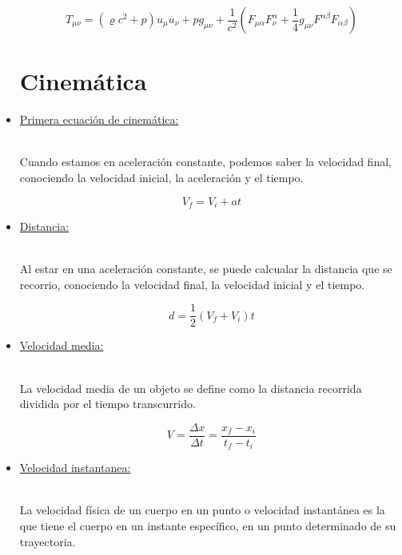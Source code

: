 \documentclass[letterpaper,12pt]{article}
\begin{document}
\begin{itemize}
{    $$T_{\mu\nu}=(\varrho c^2+p)u_\mu u_\nu + pg_{\mu\nu}+\frac{1}{c^2}(F_{\mu\alpha}F_\nu^\alpha+\frac{1}{4}g_{\mu\nu}F^{\alpha\beta}F_{\alpha\beta})$$  
    
    }
    
    \pagestyle{fancy}

    \fancyhf{}
    \rfoot{\thepage}
    
\section{\Large{Cinemática}} 
    
    \item[\checkmark]\large{\underline{Primera ecuación de cinemática:}}\\\\
    \small{Cuando estamos en aceleración constante, podemos saber la velocidad final, conociendo la velocidad inicial, la aceleración y el tiempo.


    $$V_f=V_i+at$$  
    
    }
    
    \item[\checkmark]\large{\underline{Distancia:}}\\\\
    \small{Al estar en una aceleración constante, se puede calcualar la distancia que se recorrio, conociendo la velocidad final, la velocidad inicial y el tiempo.


    $$d=\frac{1}{2}(V_f+V_i)t$$  
    
    }
    
     
    \item[\checkmark]\large{\underline{Velocidad media:}}\\\\
    \small{La velocidad media de un objeto se define como la distancia recorrida dividida por el tiempo transcurrido.


    $$V=\frac{\Delta x}{\Delta t}=\frac{x_f-x_i}{t_f-t_i}$$  
    
    }
    
    \item[\checkmark]\large{\underline{Velocidad instantanea:}}\\\\
    \small{La velocidad física de un cuerpo en un punto o velocidad instantánea es la que tiene el cuerpo en un instante específico, en un punto determinado de su trayectoria.


}
\end{itemize}
\end{document}

